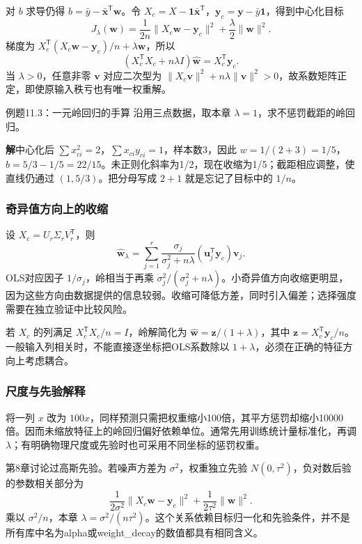 \documentclass[UTF8,fontset=none,zihao=-4,a4paper]{ctexart}
\newcommand{\sol}{\par\noindent\textbf{解}\quad}
\numberwithin{equation}{section}
\numberwithin{figure}{section}
\begin{document}
对 $b$ 求导仍得 $b=\bar y-\bar{\symbf x}^{\mathsf T}\symbf w$。令 $X_c=X-\symbf1\bar{\symbf x}^{\mathsf T}$，$\symbf y_c=\symbf y-\bar y\symbf1$，得到中心化目标
\[
 J_\lambda(\symbf w)=\frac1{2n}\|X_c\symbf w-\symbf y_c\|^2+\frac\lambda2\|\symbf w\|^2.
\]
梯度为 $X_c^{\mathsf T}(X_c\symbf w-\symbf y_c)/n+\lambda\symbf w$，所以
\begin{equation}
 (X_c^{\mathsf T}X_c+n\lambda I)\widehat{\symbf w}
 =X_c^{\mathsf T}\symbf y_c.
\end{equation}
当 $\lambda>0$，任意非零 $\symbf v$ 对应二次型为 $\|X_c\symbf v\|^2+n\lambda\|\symbf v\|^2>0$，故系数矩阵正定，即使原输入秩亏也有唯一权重解。

\begin{infobox}{例题11.3：一元岭回归的手算}
沿用三点数据，取本章 $\lambda=1$，求不惩罚截距的岭回归。
\end{infobox}
\sol 中心化后 $\sum x_{ci}^2=2$，$\sum x_{ci}y_{ci}=1$，样本数3，因此 $w=1/(2+3)=1/5$，$b=5/3-1/5=22/15$。未正则化斜率为1/2，现在收缩为1/5；截距相应调整，使直线仍通过 $(1,5/3)$。把分母写成 $2+1$ 就是忘记了目标中的 $1/n$。

\subsubsection{奇异值方向上的收缩}
设 $X_c=U_r\Sigma_rV_r^{\mathsf T}$，则
\[
 \widehat{\symbf w}_\lambda
 =\sum_{j=1}^r\frac{\sigma_j}{\sigma_j^2+n\lambda}
 (\symbf u_j^{\mathsf T}\symbf y_c)\symbf v_j.
\]
OLS对应因子 $1/\sigma_j$，岭相当于再乘 $\sigma_j^2/(\sigma_j^2+n\lambda)$。小奇异值方向收缩更明显，因为这些方向由数据提供的信息较弱。收缩可降低方差，同时引入偏差；选择强度需要在独立验证中比较风险。

若 $X_c$ 的列满足 $X_c^{\mathsf T}X_c/n=I$，岭解简化为 $\widehat{\symbf w}=\symbf z/(1+\lambda)$，其中 $\symbf z=X_c^{\mathsf T}\symbf y_c/n$。一般输入列相关时，不能直接逐坐标把OLS系数除以 $1+\lambda$，必须在正确的特征方向上考虑耦合。

\subsubsection{尺度与先验解释}
将一列 $x$ 改为 $100x$，同样预测只需把权重缩小100倍，其平方惩罚却缩小10000倍。因而未缩放特征上的岭回归偏好依赖单位。通常先用训练统计量标准化，再调 $\lambda$；有明确物理尺度或先验时也可采用不同坐标的惩罚权重。

第8章讨论过高斯先验。若噪声方差为 $\sigma^2$，权重独立先验 $N(0,\tau^2)$，负对数后验的参数相关部分为
\[
 \frac1{2\sigma^2}\|X_c\symbf w-\symbf y_c\|^2+\frac1{2\tau^2}\|\symbf w\|^2.
\]
乘以 $\sigma^2/n$，本章 $\lambda=\sigma^2/(n\tau^2)$。这个关系依赖目标归一化和先验条件，并不是所有库中名为alpha或weight\_decay的数值都具有相同含义。
\end{document}
